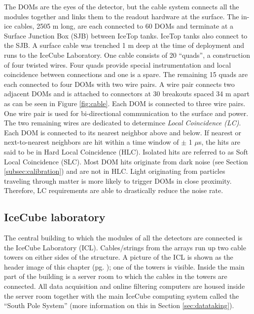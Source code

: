 The DOMs are the eyes of the detector, but the cable system connects all the modules together and links them to the readout hardware at the surface. The in-ice cables, 2505 m long, are each connected to 60 DOMs and terminate at a Surface Junction Box (SJB) between IceTop tanks. IceTop tanks also connect to the SJB. A surface cable was trenched 1 m deep at the time of deployment and runs to the IceCube Laboratory. One cable consists of 20 ``quads'', a construction of four twisted wires. Four quads provide special instrumentation and local coincidence between connections and one is a spare. The remaining 15 quads are each connected to four DOMs with two wire pairs. A wire pair connects two adjacent DOMs and is attached to connectors at 30 breakouts spaced 34 m apart as can be seen in Figure \ref{fig:cable}. Each DOM is connected to three wire pairs. One wire pair is used for bi-directional communication to the surface and power. The two remaining wires are dedicated to determince \textit{Local Coincidence (LC)}. Each DOM is connected to its nearest neighbor above and below. If nearest or next-to-nearest neighbors are hit within a time window of $\pm$ 1 $\mu$s, the hits are said to be in Hard Local Coincidence (HLC). Isolated hits are referred to as Soft Local Coincidence (SLC). Most DOM hits originate from dark noise (see Section \ref{subsec:calibration}) and are not in HLC. Light originating from particles traveling through matter is more likely to trigger DOMs in close proximity. Therefore, LC requirements are able to drastically reduce the noise rate.

\subsection{IceCube laboratory}
\label{subsec:icl}
The central building to which the modules of all the detectors are connected is the IceCube Laboratory (ICL). Cables/strings from the arrays run up two cable towers on either sides of the structure. A picture of the ICL is shown as the header image of this chapter (pg. \pageref{ch:icecube}); one of the towers is visible. Inside the main part of the building is a server room to which the cables in the towers are connected. All data acquisition and online filtering computers are housed inside the server room together with the main IceCube computing system called the ``South Pole System'' (more information on this in Section \ref{sec:datataking}).


